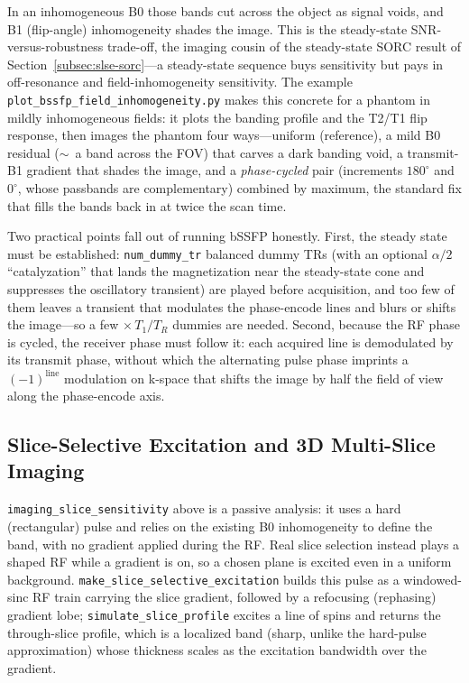 \documentclass[11pt,oneside]{report}
\newcommand{\code}[1]{\texttt{#1}}
\begin{document}
In an inhomogeneous B0 those bands cut across the object as signal voids, and B1
(flip-angle) inhomogeneity shades the image. This is the steady-state
SNR-versus-robustness trade-off, the imaging cousin of the steady-state SORC
result of Section~\ref{subsec:slse-sorc}---a steady-state sequence buys
sensitivity but pays in off-resonance and field-inhomogeneity sensitivity. The example
\code{plot\_bssfp\_field\_inhomogeneity.py} makes this concrete for a phantom in
mildly inhomogeneous fields: it plots the banding profile and the T2/T1 flip
response, then images the phantom four ways---uniform (reference), a mild B0
residual (\(\sim\)~a band across the FOV) that carves a dark banding void, a
transmit-B1 gradient that shades the image, and a \emph{phase-cycled} pair
(increments \(180^\circ\) and \(0^\circ\), whose passbands are complementary)
combined by maximum, the standard fix that fills the bands back in at twice the
scan time.

Two practical points fall out of running bSSFP honestly. First, the steady state
must be established: \code{num\_dummy\_tr} balanced dummy TRs (with an optional
\(\alpha/2\) ``catalyzation'' that lands the magnetization near the steady-state
cone and suppresses the oscillatory transient) are played before acquisition, and
too few of them leaves a transient that modulates the phase-encode lines and
blurs or shifts the image---so a few \(\times\, T_1/T_R\) dummies are needed.
Second, because the RF phase is cycled, the receiver phase must follow it: each
acquired line is demodulated by its transmit phase, without which the alternating
pulse phase imprints a \((-1)^{\text{line}}\) modulation on k-space that shifts the
image by half the field of view along the phase-encode axis.

\subsection{Slice-Selective Excitation and 3D Multi-Slice Imaging}

\code{imaging\_slice\_sensitivity} above is a passive analysis: it uses a hard
(rectangular) pulse and relies on the existing B0 inhomogeneity to define the
band, with no gradient applied during the RF. Real slice selection instead plays
a shaped RF while a gradient is on, so a chosen plane is excited even in a
uniform background. \code{make\_slice\_selective\_excitation} builds this pulse
as a windowed-sinc RF train carrying the slice gradient, followed by a refocusing
(rephasing) gradient lobe; \code{simulate\_slice\_profile} excites a line of
spins and returns the through-slice profile, which is a localized band (sharp,
unlike the hard-pulse approximation) whose thickness scales as the excitation
bandwidth over the gradient.
\end{document}
